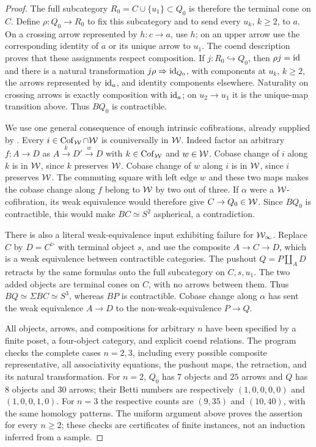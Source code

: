 \begin{proof}
The full subcategory $R_0=C\cup\{u_1\}\subset Q_0$ is therefore the terminal cone on $C$. Define $\rho:Q_0\to R_0$ to fix this subcategory and to send every $u_k$, $k\geq2$, to $a$. On a crossing arrow represented by $h:c\to a$, use $h$; on an upper arrow use the corresponding identity of $a$ or its unique arrow to $u_1$. The coend description proves that these assignments respect composition. If $j:R_0\hookrightarrow Q_0$, then $\rho j=\mathrm{id}$ and there is a natural transformation $j\rho\Rightarrow\mathrm{id}_{Q_0}$, with components at $u_k$, $k\geq2$, the arrows represented by $\mathrm{id}_a$, and identity components elsewhere. Naturality on crossing arrows is exactly composition with $\mathrm{id}_a$; on $u_2\to u_1$ it is the unique-map transition above. Thus $BQ_0$ is contractible.

We use one general consequence of enough intrinsic cofibrations, already supplied by . Every $i\in\operatorname{Cof}_{\mathcal{W}}\cap\mathcal{W}$ is couniversally in $\mathcal{W}$. Indeed factor an arbitrary $f:A\to D$ as $A\xrightarrow{k}D'\xrightarrow{w}D$ with $k\in\operatorname{Cof}_{\mathcal{W}}$ and $w\in\mathcal{W}$. Cobase change of $i$ along $k$ is in $\mathcal{W}$, since $k$ preserves $\mathcal{W}$. Cobase change of $w$ along $i$ is in $\mathcal{W}$, since $i$ preserves $\mathcal{W}$. The commuting square with left edge $w$ and these two maps makes the cobase change along $f$ belong to $\mathcal{W}$ by two out of three. If $\alpha$ were a $\mathcal{W}$-cofibration, its weak equivalence would therefore give $C\to Q_0\in\mathcal{W}$. Since $BQ_0$ is contractible, this would make $BC\simeq S^2$ aspherical, a contradiction.

There is also a literal weak-equivalence input exhibiting failure for $\mathcal{W}_{\infty}$. Replace $C$ by $D=C^{\triangleright}$ with terminal object $s$, and use the composite $A\to C\to D$, which is a weak equivalence between contractible categories. The pushout $Q=P\amalg_A D$ retracts by the same formulas onto the full subcategory on $C,s,u_1$. The two added objects are terminal cones on $C$, with no arrows between them. Thus $BQ\simeq\Sigma BC\simeq S^3$, whereas $BP$ is contractible. Cobase change along $\alpha$ has sent the weak equivalence $A\to D$ to the non-weak-equivalence $P\to Q$.

All objects, arrows, and compositions for arbitrary $n$ have been specified by a finite poset, a four-object category, and explicit coend relations. The program checks the complete cases $n=2,3$, including every possible composite representative, all associativity equations, the pushout maps, the retraction, and its natural transformation. For $n=2$, $Q_0$ has $7$ objects and $25$ arrows and $Q$ has $8$ objects and $30$ arrows; their Betti numbers are respectively $(1,0,0,0,0)$ and $(1,0,0,1,0)$. For $n=3$ the respective counts are $(9,35)$ and $(10,40)$, with the same homology patterns. The uniform argument above proves the assertion for every $n\geq2$; these checks are certificates of finite instances, not an induction inferred from a sample.


\end{proof}
